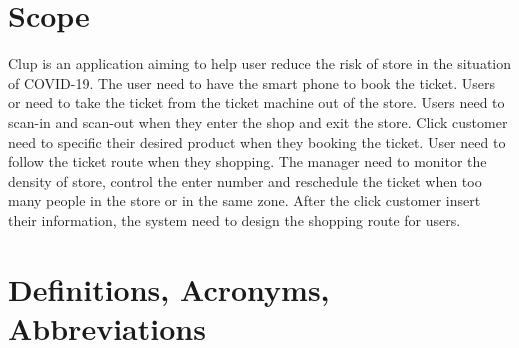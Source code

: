 \documentclass[a4paper,12pt]{report}
\begin{document}
\section{Scope}
Clup is an application aiming to help user reduce the risk of store in the situation of COVID-19. The user need to have the smart phone to book the ticket. Users or need to take the ticket from the ticket machine out of the store. Users need to scan-in and scan-out when they enter the shop and exit the store. Click customer need to specific their desired product when they booking the ticket. User need to follow the ticket route when they shopping. The manager need to monitor the density of store, control the enter number and reschedule the ticket when too many people in the store or in the same zone. After the click customer insert their information, the system need to design the shopping route for users.


\section{Definitions, Acronyms, Abbreviations}
\end{document}
